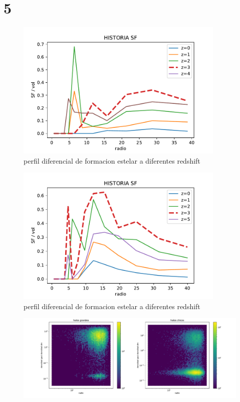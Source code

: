 \chapter{5}

\begin{figure}[h]
\centering
\includegraphics[width=10cm]{Figures/RSF_history.pdf}
\decoRule
\caption[RSF hsitory]{perfil diferencial de formacion estelar a diferentes redshift}
\label{fig:Electron}
\end{figure}

\begin{figure}[h]
\centering
\includegraphics[width=10cm]{Figures/SSF_history.pdf}
\decoRule
\caption[SSF hsitory]{perfil diferencial de formacion estelar a diferentes redshift}
\label{fig:Electron}
\end{figure}

\begin{figure}[h]
\centering
\includegraphics[width=18cm]{Figures/R_sctFRACC1.pdf}
\decoRule
\caption[perfil del void R]{}
\label{fig:Electron}
\end{figure}

